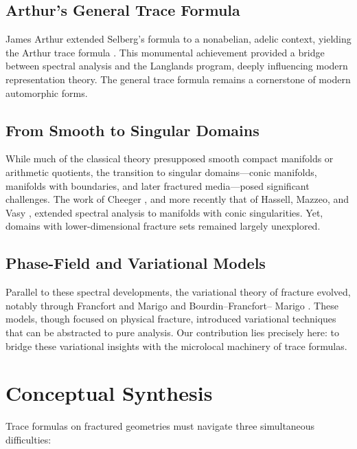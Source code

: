 \subsection{Arthur’s General Trace Formula}

James Arthur extended Selberg’s formula to a nonabelian, adelic context, yielding the
Arthur trace formula \cite{Arthur1989}. This monumental achievement provided a bridge
between spectral analysis and the Langlands program, deeply influencing modern
representation theory. The general trace formula remains a cornerstone of modern
automorphic forms.

\subsection{From Smooth to Singular Domains}

While much of the classical theory presupposed smooth compact manifolds or arithmetic
quotients, the transition to singular domains—conic manifolds, manifolds with
boundaries, and later fractured media—posed significant challenges. The work of
Cheeger \cite{Cheeger1983}, and more recently that of Hassell, Mazzeo, and Vasy
\cite{HassellMazzeoVasy2015}, extended spectral analysis to manifolds with conic
singularities. Yet, domains with lower-dimensional fracture sets remained largely
unexplored.

\subsection{Phase-Field and Variational Models}

Parallel to these spectral developments, the variational theory of fracture evolved,
notably through Francfort and Marigo \cite{FrancfortMarigo1998} and Bourdin–Francfort–
Marigo \cite{BourdinFrancfortMarigo2008}. These models, though focused on physical
fracture, introduced variational techniques that can be abstracted to pure analysis.
Our contribution lies precisely here: to bridge these variational insights with the
microlocal machinery of trace formulas.


\section{Conceptual Synthesis}

Trace formulas on fractured geometries must navigate three simultaneous
difficulties:

